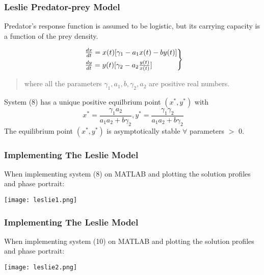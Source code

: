\documentclass[xcolor={svgnames},hyperref={colorlinks,allcolors=Blue}]{beamer}
\begin{document}
\begin{frame} 
\frametitle{Leslie Predator-prey Model}

Predator's response function is assumed to be logistic, but its carrying capacity is a function of the prey density. 

\pause	
	\begin{equation}
		\begin{rcases}
		~\frac{dx}{dt} = x(t)[\gamma_1 - a_1x(t) - by(t)] \\
		~\frac{dy}{dt} = y(t)[\gamma_2 - a_2\frac{y(t)}{x(t)}]
		\end{rcases}
	\end{equation}

	\begin{quote}
	where all the parameters $\gamma_1, a_1, b,\gamma_2, a_2$ are positive real numbers. 
	\end{quote}
	
\pause
System (8) has a unique positive equilbrium point $(x^*,y^*)$ with 
	\begin{equation} 
	~x^* = \frac{\gamma_1a_2}{a_1a_2+b\gamma_2}, y^* = \frac{\gamma_1\gamma_2}{a_1a_2+b\gamma_2}
	\end{equation}
\pause
The equilibrium point $(x^*,y^*)$ is asymptotically stable $\forall$ parameters $>$ 0.
\end{frame}

\begin{frame} 
\frametitle{Implementing The Leslie Model}
When implementing system (8) on MATLAB and plotting the solution profiles and phase portrait: 

	\begin{center}
	\pause
		\texttt{[image: leslie1.png]}
	\end{center}

\end{frame}

\begin{frame} 
\frametitle{Implementing The Leslie Model}
When implementing system (10) on MATLAB and plotting the solution profiles and phase portrait: 

	\begin{center}
		\texttt{[image: leslie2.png]}
	\end{center}

\end{frame}
\end{document}
